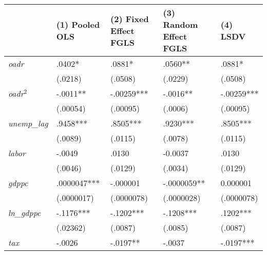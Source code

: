 \documentclass[ %
    final,
    scrbook,
    listoffigures,
    listoftables, 
    glossary]{cu-thesis}
\begin{document}
\begin{center}
\begin{longtable}{|m{2cm}|m{3cm}|m{3cm}|m{2.5cm}|m{3.5cm}|}
\hline
& \textbf{(1) Pooled OLS} & \textbf{(2) Fixed Effect FGLS} & \textbf{(3) Random Effect FGLS} & \textbf{(4) LSDV} \\ 

\hline
\textit{oadr} & .0402*\footnotemark & .0881* & .0560** & .0881*\\  
      &(.0218) & (.0508) & (.0229) & (.0508)\\
\hline
\textit{oadr}$^{2}$ & -.0011** & -.00259*** & -.0016** & -.00259***\\  
      & (.00054) & (.00095) & (.0006) & (.00095)\\
\hline
\textit{unemp\_lag} & .9458*** & .8505*** & .9230*** & .8505***\\  
     & (.0089) & (.0115) & (.0078) & (.0115)\\      
\hline
\textit{labor} & -.0049 & .0130 & -0.0037 & .0130\\  
     & (.0046) & (.0129) & (.0034) & (.0129)\\ 
  \hline
  \textit{gdppc} & .0000047*** & -.000001 & -.0000059** & 0.000001\\ 
  & (.0000017) & (.0000078) & (.0000028) & (.0000078)\\ 
  \hline
  \textit{ln\_gdppc} & -.1176*** & -.1202*** & -.1208*** & .1202***\\ 

  & (.02362) & (.0087) & (.0085) & (.0087)\\ 
  \hline
  \textit{tax} & -.0026 & -.0197** & -.0037 & -.0197***\\ 


\end{longtable}
\end{center}
\end{document}
